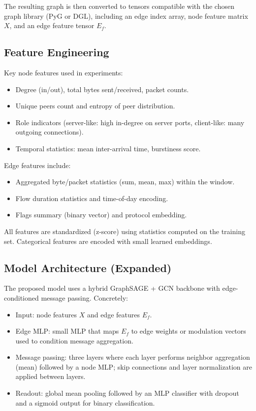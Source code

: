 \documentclass[conference]{IEEEtran}
\begin{document}
The resulting graph is then converted to tensors compatible with the chosen graph library (PyG or DGL), including an edge index array, node feature matrix $X$, and an edge feature tensor $E_f$.

\subsection{Feature Engineering}

Key node features used in experiments:
\begin{itemize}
	\item Degree (in/out), total bytes sent/received, packet counts.
	\item Unique peers count and entropy of peer distribution.
	\item Role indicators (server-like: high in-degree on server ports, client-like: many outgoing connections).
	\item Temporal statistics: mean inter-arrival time, burstiness score.
\end{itemize}

Edge features include:
\begin{itemize}
	\item Aggregated byte/packet statistics (sum, mean, max) within the window.
	\item Flow duration statistics and time-of-day encoding.
	\item Flags summary (binary vector) and protocol embedding.
\end{itemize}

All features are standardized (z-score) using statistics computed on the training set. Categorical features are encoded with small learned embeddings.

\subsection{Model Architecture (Expanded)}

The proposed model uses a hybrid GraphSAGE + GCN backbone with edge-conditioned message passing. Concretely:

\begin{itemize}
	\item Input: node features $X$ and edge features $E_f$.
	\item Edge MLP: small MLP that maps $E_f$ to edge weights or modulation vectors used to condition message aggregation.
	\item Message passing: three layers where each layer performs neighbor aggregation (mean) followed by a node MLP; skip connections and layer normalization are applied between layers.
	\item Readout: global mean pooling followed by an MLP classifier with dropout and a sigmoid output for binary classification.
\end{itemize}
\end{document}
